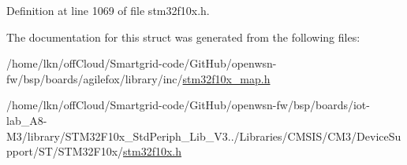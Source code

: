 Definition at line 1069 of file stm32f10x.\+h.



The documentation for this struct was generated from the following files\+:\begin{DoxyCompactItemize}
\item 
/home/lkn/off\+Cloud/\+Smartgrid-\/code/\+Git\+Hub/openwsn-\/fw/bsp/boards/agilefox/library/inc/\hyperlink{agilefox_2library_2inc_2stm32f10x__map_8h}{stm32f10x\+\_\+map.\+h}\item 
/home/lkn/off\+Cloud/\+Smartgrid-\/code/\+Git\+Hub/openwsn-\/fw/bsp/boards/iot-\/lab\+\_\+\+A8-\/\+M3/library/\+S\+T\+M32\+F10x\+\_\+\+Std\+Periph\+\_\+\+Lib\+\_\+\+V3../\+Libraries/\+C\+M\+S\+I\+S/\+C\+M3/\+Device\+Support/\+S\+T/\+S\+T\+M32\+F10x/\hyperlink{iot-lab___a8-_m3_2library_2_s_t_m32_f10x___std_periph___lib___v3_85_80_2_libraries_2_c_m_s_i_s_26497265545392eb5694b064ae15018db}{stm32f10x.\+h}\end{DoxyCompactItemize}
